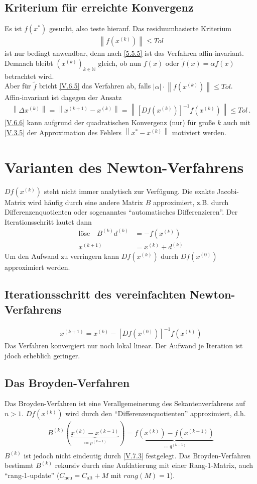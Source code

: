 \documentclass[ngerman,fontsize=11pt, paper=a4, parskip=half, titlepage=true, toc=bib]{scrbook}
\theoremstyle{definition}
\theoremstyle{plain}
\newcommand{\N}{\mathds{N}}
\newcommand{\nn}[1]{\left\| #1 \right\|}
\newcommand{\sectione}[1]{ \setcounter{equation}{0}\section{#1}}
\newcommand{\subsectione}[1]{\addtocounter{Def}{1}\subsection{#1}}
\begin{document}
  
  \subsectione{Kriterium für erreichte Konvergenz}
  Es ist $f(x^{*})$ gesucht, also teste hierauf. Das residuumbasierte Kriterium
  \begin{gather}
    \nn{f(x^{(k)})}\leq Tol
    \label{V.6.5}
  \end{gather}
  ist nur bedingt anwendbar, denn nach \ref{5.5.5} ist das Verfahren affin-invariant.
  Demnach bleibt $(x^{(k)})_{k\in\N}$ gleich,
  ob nun $f(x)$ oder $\widetilde{f}(x) =\alpha f(x) $ betrachtet wird.\\
  Aber für $\widetilde{f}$ bricht \eqref{V.6.5} das Verfahren ab, 
  falls $|\alpha|\cdot \nn{f(x^{(k)})} \leq Tol$. \\
  Affin-invariant ist dagegen der Ansatz
  \begin{gather}
    \nn{\Delta x^{(k)}}= \nn{x^{(k+1)}-x^{(k)}} 
    = \nn{[Df(x^{(k)})]^{-1}f(x^{(k)})} 
    \leq Tol \, .
    \label{V.6.6}
  \end{gather}
  \eqref{V.6.6} kann aufgrund der quadratischen Konvergenz (nur) für 
  große $k$ auch mit \eqref{V.3.5} der Approximation des Fehlers 
  $\nn{x^{*}-x^{(k)}} $ motiviert werden.
  
  
  \sectione{Varianten des Newton-Verfahrens}
  $Df(x^{(k)})$ steht nicht immer analytisch zur Verfügung.
  Die exakte Jacobi-Matrix wird häufig durch eine andere Matrix $B$ approximiert, 
  z.B. durch Differenzenquotienten oder sogenanntes
  \enquote{automatisches Differenzieren}.
  Der Iterationsschritt lautet dann
  \begin{align}
    \text{löse}\quad B^{(k)}d^{(k)} &= -f(x^{(k)}) 
                                      \label{V.7.1} \\\nonumber
    x^{(k+1)} &=x^{(k)} + d^{(k)}
  \end{align}
  Um den Aufwand zu verringern kann $Df(x^{(k)})$ durch
  $Df(x^{(0)})$ approximiert werden.
  
  
  \subsectione{Iterationsschritt des vereinfachten Newton-Verfahrens}
  \begin{gather}
    x^{(k+1)} = x^{(k)} -[Df(x^{(0)})]^{-1} f(x^{(k)})
    \label{V.7.2}
  \end{gather}
  Das Verfahren konvergiert nur noch lokal linear.
  Der Aufwand je Iteration ist jdoch erheblich geringer.
  
  
  
  \subsectione{Das Broyden-Verfahren}
  Das Broyden-Verfahren ist eine Verallgemeinerung des Sekantenverfahrens
  auf $n>1$. $Df(x^{(k)})$ wird durch den
  \enquote{Differenzenquotienten} approximiert, d.h.
  \begin{gather}
    B^{(k)}(\underbrace{x^{(k)}-x^{(k-1)}}_{\coloneqq p^{(k-1)}})
    = \underbrace{f(x^{(k)})-f(x^{(k-1)})}_{\coloneqq
      q^{(k-1)}}
    \label{V.7.3}
  \end{gather}
  $B^{(k)}$ ist jedoch nicht eindeutig durch \eqref{V.7.3} festgelegt.
  Das Broyden-Verfahren bestimmt $B^{(k)}$ rekursiv durch eine 
  Aufdatierung mit einer Rang-1-Matrix, auch \enquote{rang-1-update}
  ($C_\text{neu} = C_\text{alt} +M$ mit $rang(M)=1$). \\
\end{document}
